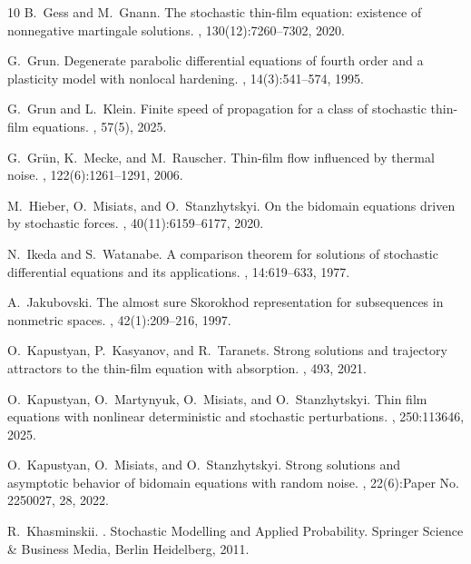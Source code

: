 \documentclass[a4paper,12pt]{article}
\numberwithin{equation}{section}
\begin{document}
\begin{thebibliography}{10}
B.~Gess and M.~Gnann.
\newblock The stochastic thin-film equation: existence of nonnegative
  martingale solutions.
, 130(12):7260--7302, 2020.

G.~Grun.
\newblock Degenerate parabolic differential equations of fourth order and a
  plasticity model with nonlocal hardening.
, 14(3):541--574, 1995.

G.~Grun and L.~Klein.
\newblock Finite speed of propagation for a class of stochastic thin-film
  equations.
, 57(5), 2025.

G.~Gr\"{u}n, K.~Mecke, and M.~Rauscher.
\newblock Thin-film flow influenced by thermal noise.
, 122(6):1261--1291, 2006.

M.~Hieber, O.~Misiats, and O.~Stanzhytskyi.
\newblock On the bidomain equations driven by stochastic forces.
, 40(11):6159--6177, 2020.

N.~Ikeda and S.~Watanabe.
\newblock A comparison theorem for solutions of stochastic differential
  equations and its applications.
, 14:619--633, 1977.

A.~Jakubovski.
\newblock The almost sure \mbox{Skorokhod} representation for subsequences in
  nonmetric spaces.
, 42(1):209--216, 1997.

O.~Kapustyan, P.~Kasyanov, and R.~Taranets.
\newblock Strong solutions and trajectory attractors to the thin-film equation
  with absorption.
, 493, 2021.

O.~Kapustyan, O.~Martynyuk, O.~Misiats, and O.~Stanzhytskyi.
\newblock Thin film equations with nonlinear deterministic and stochastic
  perturbations.
, 250:113646, 2025.

O.~Kapustyan, O.~Misiats, and O.~Stanzhytskyi.
\newblock Strong solutions and asymptotic behavior of bidomain equations with
  random noise.
, 22(6):Paper No. 2250027, 28, 2022.

R.~Khasminskii.
.
\newblock Stochastic Modelling and Applied Probability. Springer Science \&
  Business Media, Berlin Heidelberg, 2011.


\end{thebibliography}
\end{document}
